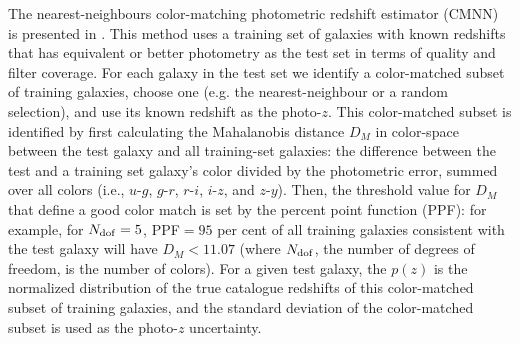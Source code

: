 The nearest-neighbours color-matching photometric redshift estimator (\textsc{CMNN}) is presented in \citet[][herafter G18]{Graham:17}. This method uses a training set of galaxies with known redshifts that has equivalent or better photometry as the test set in terms of quality and filter coverage. For each galaxy in the test set we identify a color-matched subset of training galaxies, choose one (e.g. the nearest-neighbour or a random selection), and use its known redshift as the photo-$z$. This color-matched subset is identified by first calculating the Mahalanobis distance $D_M$ in color-space between the test galaxy and all training-set galaxies: the difference between the test and a training set galaxy's color divided by the photometric error, summed over all colors (i.e., $u$-$g$, $g$-$r$, $r$-$i$, $i$-$z$, and $z$-$y$). Then, the threshold value for $D_M$ that define a good color match is set by the percent point function (PPF): for example, for $N_{\rm dof}=5$, PPF$=95$ per cent of all training galaxies consistent with the test galaxy will have $D_M < 11.07$ (where $N_{\rm dof}$, the number of degrees of freedom, is the number of colors). For a given test galaxy, the $p(z)$ is the normalized distribution of the true catalogue redshifts of this color-matched subset of training galaxies, and the standard deviation of the color-matched subset is used as the photo-$z$ uncertainty.

